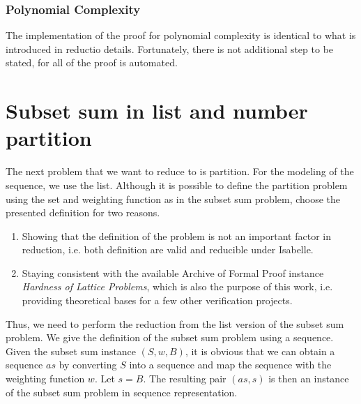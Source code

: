 \subsubsection{Polynomial Complexity}
The implementation of the proof for polynomial complexity is identical to what is introduced in reductio details. Fortunately, 
there is not additional step to be stated, for all of the proof is automated. 

\section{Subset sum in list and number partition}
The next problem that we want to reduce to is partition.
For the modeling of the sequence, we use the list. Although it is possible 
to define the partition problem using the set and weighting function as in the subset
sum problem, choose the presented definition for two reasons.
\begin{enumerate}
    \item Showing that the definition of the problem is not an important factor 
    in reduction, i.e. both definition are valid and reducible under Isabelle.
    \item Staying consistent with the available Archive of Formal Proof instance 
    \textit{Hardness of Lattice Problems}, which is also the purpose of this work,
    i.e. providing theoretical bases for a few other verification projects.
\end{enumerate} 
Thus, we need to perform the reduction from the list version of the subset sum problem. 
We give the definition of the subset sum problem using a sequence. 
Given the subset sum instance $(S, w, B)$, it is obvious that we can obtain a sequence $as$ by
converting $S$ into a sequence and map the sequence with the weighting function $w$. Let $s = B$.
The resulting pair $(as, s)$ is then an instance of the subset sum problem in sequence representation. 
